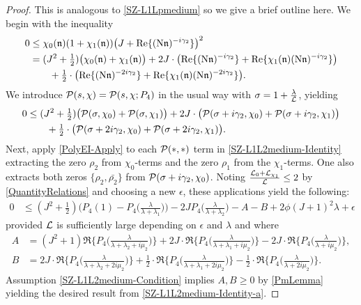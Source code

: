 \documentclass[12pt,psamsfonts]{amsart}
\theoremstyle{definition}
\theoremstyle{remark}
\numberwithin{equation}{section}
\begin{document}
\begin{proof} This is analogous to \cref{SZ-L1Lpmedium} so we give a brief outline here. We begin with the inequality
\begin{align*}
0 & \leq \chi_0(\mathfrak{n}) (1+\chi_1(\mathfrak{n})) \big( J + \mathrm{Re}\{ (\mathrm{N}\mathfrak{n})^{-i\gamma_2} \} \big)^2 \\
& = (J^2+\tfrac{1}{2})\big( \chi_0(\mathfrak{n}) + \chi_1(\mathfrak{n}) \big) + 2J \cdot \big( \mathrm{Re}\{ (\mathrm{N}\mathfrak{n})^{-i\gamma_2} \} + \mathrm{Re}\{ \chi_1(\mathfrak{n}) (\mathrm{N}\mathfrak{n})^{-i\gamma_2} \} \big)  \\
& \qquad + \tfrac{1}{2} \cdot \big( \mathrm{Re}\{ (\mathrm{N}\mathfrak{n})^{-2i\gamma_2} \} + \mathrm{Re}\{ \chi_1(\mathfrak{n}) (\mathrm{N}\mathfrak{n})^{-2i\gamma_2} \} \big). 
\end{align*}
We introduce $\mathcal{P}(s,\chi) = \mathcal{P}(s, \chi; P_4)$ in the usual way with $\sigma = 1 + \tfrac{\lambda}{\mathcal{L}}$, yielding
\begin{equation}
\label{SZ-L1L2medium-Identity}
\begin{aligned}
0 & \leq (J^2+\tfrac{1}{2})\big( \mathcal{P}(\sigma, \chi_0) + \mathcal{P}(\sigma, \chi_1) \big) + 2J \cdot \big( \mathcal{P}(\sigma+i\gamma_2, \chi_0)  +  \mathcal{P}(\sigma+i\gamma_2, \chi_1)  \big)  \\
& \qquad + \tfrac{1}{2} \cdot \big(  \mathcal{P}(\sigma+2i\gamma_2, \chi_0) +  \mathcal{P}(\sigma+2i\gamma_2, \chi_1)\big). 
\end{aligned}
\end{equation}
Next, apply \cref{PolyEI-Apply} to each $\mathcal{P}(\ast, \ast)$ term in \eqref{SZ-L1L2medium-Identity} extracting the zero $\rho_2$ from $\chi_0$-terms and the zero $\rho_1$ from the $\chi_1$-terms. One also extracts both zeros $\{\rho_2, \bar{\rho_2}\}$ from $\mathcal{P}(\sigma+i\gamma_2, \chi_0)$. Noting $\frac{\mathcal{L}_0+\mathcal{L}_{\chi_1}}{\mathcal{L}} \leq 2$ by \cref{QuantityRelations} and choosing a new $\epsilon$, these applications yield the following:
\begin{equation}
\label{SZ-L1L2medium-Identity-a}
\begin{aligned}
0 & \leq (J^2 + \tfrac{1}{2}) \big( P_4(1) - P_4\big( \frac{\lambda}{\lambda+\lambda_1} \big) \big) - 2J P_4\big( \frac{\lambda}{\lambda+\lambda_2} \big)  - A - B + 2 \phi(J+1)^2 \lambda + \epsilon
\end{aligned}
\end{equation}
provided $\mathcal{L}$ is sufficiently large depending on $\epsilon$ and $\lambda$ and where
\begin{align*}
A & = (J^2 + 1)  \Re\big\{ P_4\big( \frac{\lambda}{\lambda+\lambda_2 + i\mu_2} \big) \big\}  +  2J \cdot  \Re\big\{ P_4\big( \frac{\lambda}{\lambda+\lambda_1+i\mu_2} \big) \big\} - 2J \cdot \Re\Big\{ P_4\big( \frac{\lambda}{\lambda +i\mu_2} \big) \Big\}, \\
B & = 2J \cdot  \Re\big\{ P_4\big( \frac{\lambda}{\lambda+\lambda_2 + 2i\mu_2} \big) \big\}  +  \frac{1}{2} \cdot  \Re\big\{ P_4\big( \frac{\lambda}{\lambda+\lambda_1+2i\mu_2} \big) \big\} - \frac{1}{2} \cdot \Re\Big\{ P_4\big( \frac{\lambda}{\lambda +2i\mu_2} \big) \Big\}. 
\end{align*}
Assumption \eqref{SZ-L1L2medium-Condition} implies $A,B \geq 0$ by \cref{PmLemma} yielding the desired result from \eqref{SZ-L1L2medium-Identity-a}. \end{proof}
\end{document}
